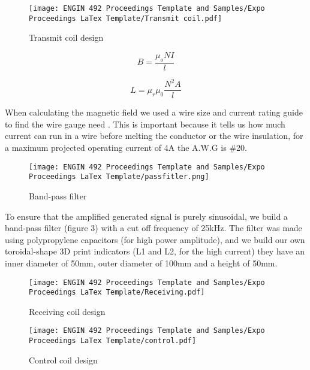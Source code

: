 \documentclass[fleqn,10pt]{document} %
\begin{document}
\begin{figure}[ht]\centering
    \texttt{[image: ENGIN 492 Proceedings Template and Samples/Expo Proceedings LaTex Template/Transmit coil.pdf]}
    \caption{Transmit coil design}
    \label{fig:Transimit}
\end{figure}

\begin{equation}
    B = \frac{\mu_oNI}{l}
\end{equation}

\begin{equation}
	L = \mu_r\mu_0\frac{N^2A}{l}
	\label{eq:refname2}
\end{equation}

When calculating the magnetic field we used a wire size and current rating guide to find the wire gauge need \cite{p13}. This is important because it tells us how much current can run in a wire before melting the conductor or the wire insulation, for a maximum projected operating current of 4A the A.W.G is \#20.

\begin{figure}[ht]\centering
    \texttt{[image: ENGIN 492 Proceedings Template and Samples/Expo Proceedings LaTex Template/passfitler.png]}
    \caption{Band-pass filter}
    \label{fig:filters bandpass}
\end{figure}

To ensure that the amplified  generated signal is purely sinusoidal,  we build a band-pass filter (figure 3) with a cut off frequency of 25kHz. The filter was made using polypropylene capacitors (for high power amplitude), and we build our own toroidal-shape 3D print indicators (L1 and L2, for the high current) they have an inner diameter of 50mm, outer diameter of 100mm and a height of 50mm.

\begin{figure}[ht]\centering
    \texttt{[image: ENGIN 492 Proceedings Template and Samples/Expo Proceedings LaTex Template/Receiving.pdf]}
    \caption{Receiving coil design}
    \label{fig:receving}
\end{figure}

\begin{figure}[ht]\centering
    \texttt{[image: ENGIN 492 Proceedings Template and Samples/Expo Proceedings LaTex Template/control.pdf]}
    \caption{Control coil design}
    \label{fig:Control}
\end{figure}
\end{document}
